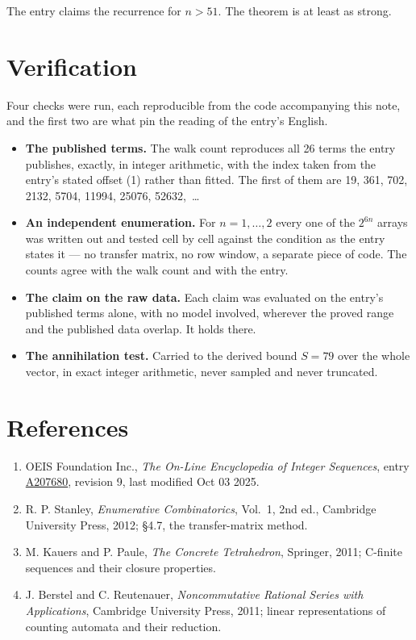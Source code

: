 \documentclass[11pt]{article}
\theoremstyle{definition}
\begin{document}
The entry claims the recurrence for $n > 51$. The theorem is at least as strong.

\section{Verification}

Four checks were run, each reproducible from the code accompanying this note, and the first two are what pin the reading of the entry's English.

\begin{itemize}

\item {\bfseries The published terms.} The walk count reproduces all 26 terms the entry publishes, exactly, in integer arithmetic, with the index taken from the entry's stated offset (1) rather than fitted. The first of them are 19, 361, 702, 2132, 5704, 11994, 25076, 52632,~\dots

\item {\bfseries An independent enumeration.} For $n = 1,\dots,2$ every one of the $2^{6n}$ arrays was written out and tested cell by cell against the condition as the entry states it --- no transfer matrix, no row window, a separate piece of code. The counts agree with the walk count and with the entry.

\item {\bfseries The claim on the raw data.} Each claim was evaluated on the entry's published terms alone, with no model involved, wherever the proved range and the published data overlap. It holds there.

\item {\bfseries The annihilation test.} Carried to the derived bound $S = 79$ over the whole vector, in exact integer arithmetic, never sampled and never truncated.

\end{itemize}

\section{References}

\begin{enumerate}

\item OEIS Foundation Inc., \emph{The On-Line Encyclopedia of Integer Sequences}, entry \href{https://oeis.org/A207680}{A207680}, revision 9, last modified Oct 03 2025.

\item R. P. Stanley, \emph{Enumerative Combinatorics}, Vol.~1, 2nd ed., Cambridge University Press, 2012; \S4.7, the transfer-matrix method.

\item M. Kauers and P. Paule, \emph{The Concrete Tetrahedron}, Springer, 2011; C-finite sequences and their closure properties.

\item J. Berstel and C. Reutenauer, \emph{Noncommutative Rational Series with Applications}, Cambridge University Press, 2011; linear representations of counting automata and their reduction.

\end{enumerate}
\end{document}
